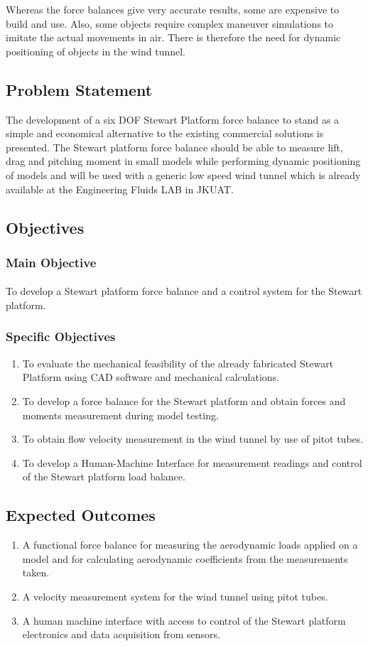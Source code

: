 Whereas the force balances give very accurate results, some are expensive to build and use. Also, some objects require complex maneuver simulations to imitate the actual movements in air. There is therefore the need for dynamic positioning of objects in the wind tunnel.
\subsection{Problem Statement}
 The development of a six DOF Stewart Platform force balance to stand as a simple and economical alternative to the existing commercial solutions is presented. The Stewart platform force balance should be able to measure lift, drag and pitching moment in small models while performing dynamic positioning of models and will be used with a generic low speed wind tunnel which is already available at the Engineering Fluids LAB in JKUAT.
\subsection{Objectives}
\subsubsection{Main Objective}
\paragraph{} To develop a Stewart platform force balance and a control system for the Stewart platform. 
\subsubsection{Specific Objectives}
\begin{enumerate}
\item To evaluate the mechanical feasibility of the already fabricated Stewart Platform using CAD software and mechanical calculations.
\item To develop a force balance for the Stewart platform and obtain forces and moments measurement during model testing.
\item To obtain flow velocity measurement in the wind tunnel by use of pitot tubes.
\item To develop a Human-Machine Interface for measurement readings and control of the Stewart platform load balance.
\end{enumerate}
\subsection{Expected Outcomes}
\begin{enumerate}
\item A functional force balance for measuring the aerodynamic loads applied on a model
and for calculating aerodynamic coefficients from the measurements taken.
\item A velocity measurement system for the wind tunnel using pitot tubes.
\item A human machine interface with access to control of the Stewart platform electronics
and data acquisition from sensors.
\end{enumerate}
